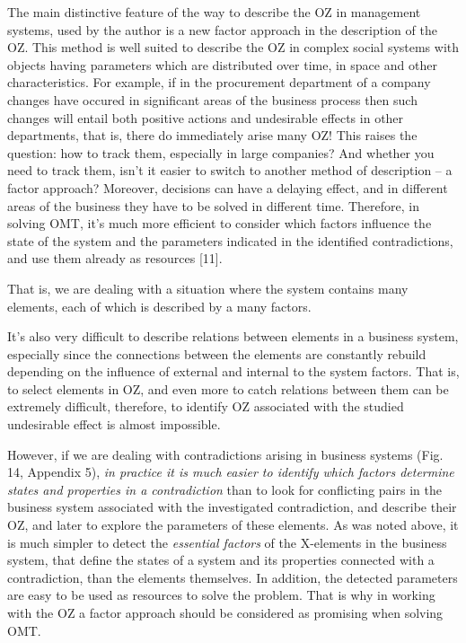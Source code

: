\documentclass[11pt,a4paper]{book}
\begin{document}
The main distinctive feature of the way to describe the OZ in management
systems, used by the author is a new factor approach in the description of the
OZ. This method is well suited to describe the OZ in complex social systems
with objects having parameters which are distributed over time, in space and
other characteristics. For example, if in the procurement department of a
company changes have occured in significant areas of the business process then
such changes will entail both positive actions and undesirable effects in
other departments, that is, there do immediately arise many OZ! This raises
the question: how to track them, especially in large companies? And whether
you need to track them, isn’t it easier to switch to another method of
description -- a factor approach?  Moreover, decisions can have a delaying
effect, and in different areas of the business they have to be solved in
different time. Therefore, in solving OMT, it’s much more efficient to
consider which factors influence the state of the system and the parameters
indicated in the identified contradictions, and use them already as resources
[11].

That is, we are dealing with a situation where the system contains many
elements, each of which is described by a many factors.

It’s also very difficult to describe relations between elements in a business
system, especially since the connections between the elements are constantly
rebuild depending on the influence of external and internal to the system
factors.  That is, to select elements in OZ, and even more to catch relations
between them can be extremely difficult, therefore, to identify OZ associated
with the studied undesirable effect is almost impossible.

However, if we are dealing with contradictions arising in business systems
(Fig. 14, Appendix 5), \emph{in practice it is much easier to identify which
  factors determine states and properties in a contradiction} than to look for
conflicting pairs in the business system associated with the investigated
contradiction, and describe their OZ, and later to explore the parameters of
these elements. As was noted above, it is much simpler to detect the
\emph{essential factors} of the X-elements in the business system, that define
the states of a system and its properties connected with a contradiction, than
the elements themselves. In addition, the detected parameters are easy to be
used as resources to solve the problem. That is why in working with the OZ a
factor approach should be considered as promising when solving OMT.
\end{document}
